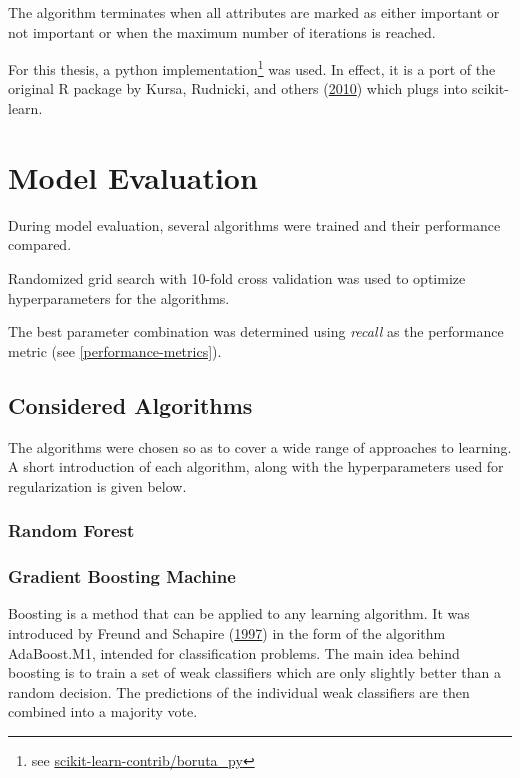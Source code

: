 \documentclass[
  11pt,
  a4paper,
  DIV=12,captions=tableheading,oneside]{scrbook}
\begin{document}
The algorithm terminates when all attributes are marked as either important or not important or when the maximum number of iterations is reached.

For this thesis, a python implementation\footnote{see \href{https://github.com/scikit-learn-contrib/boruta_py}{scikit-learn-contrib/boruta\_py}} was used. In effect, it is a port of the original R package by Kursa, Rudnicki, and others (\protect\hyperlink{ref-kursa2010boruta}{2010}) which plugs into scikit-learn.

\hypertarget{model-evaluation}{%
\section{Model Evaluation}\label{model-evaluation}}

During model evaluation, several algorithms were trained and their performance compared.

Randomized grid search with 10-fold cross validation was used to optimize hyperparameters for the algorithms.

The best parameter combination was determined using \emph{recall} as the performance metric (see \ref{performance-metrics}).

\hypertarget{considered-algorithms}{%
\subsection{Considered Algorithms}\label{considered-algorithms}}

The algorithms were chosen so as to cover a wide range of approaches to learning. A short introduction of each algorithm, along with the hyperparameters used for regularization is given below.

\hypertarget{random-forest}{%
\subsubsection{Random Forest}\label{random-forest}}

\hypertarget{gradient-boosting-machine}{%
\subsubsection{Gradient Boosting Machine}\label{gradient-boosting-machine}}

Boosting is a method that can be applied to any learning algorithm. It was introduced by Freund and Schapire (\protect\hyperlink{ref-freund1997decision}{1997}) in the form of the algorithm AdaBoost.M1, intended for classification problems. The main idea behind boosting is to train a set of weak classifiers which are only slightly better than a random decision. The predictions of the individual weak classifiers are then combined into a majority vote.
\end{document}
